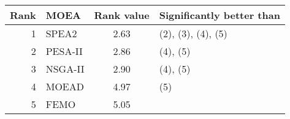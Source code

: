 \begin{tabular}{ r l c l}
\hline
    \textbf{Rank} & \textbf{MOEA} & \textbf{Rank value} & \textbf{Significantly better than} \\
    \hline
    1    & SPEA2    & 2.63    & (2), (3), (4), (5) \\
    2    & PESA-II  & 2.86    & (4), (5) \\
    3    & NSGA-II  & 2.90    & (4), (5) \\
    4    & MOEAD    & 4.97    & (5) \\
    5    & FEMO     & 5.05    &  \\
    \hline
    \end{tabular}